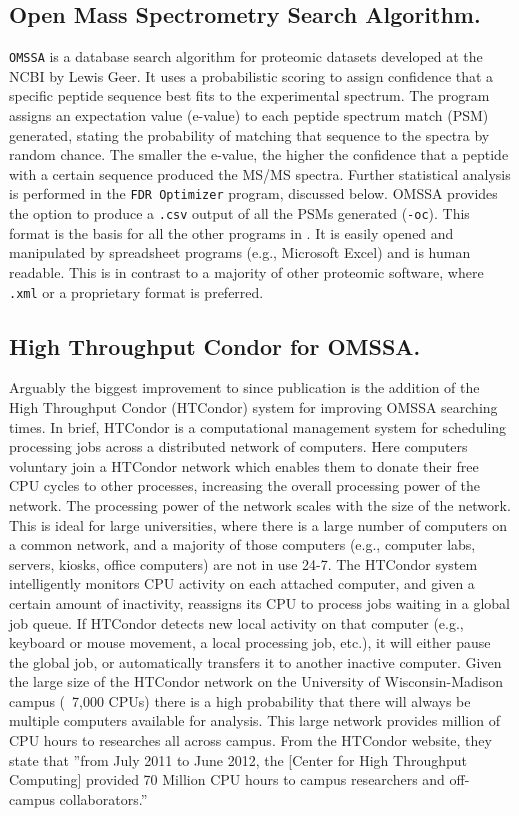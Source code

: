 \subsection*{Open Mass Spectrometry Search Algorithm.}
\texttt{OMSSA} is a database search algorithm for proteomic datasets developed at the NCBI by Lewis Geer.\cite{omssa} It uses a probabilistic scoring to assign confidence that a specific peptide sequence best fits to the experimental spectrum. The program assigns an expectation value (e-value) to each peptide spectrum match (PSM) generated, stating the probability of matching that sequence to the spectra by random chance. The smaller the e-value, the higher the confidence that a peptide with a certain sequence produced the MS/MS spectra. Further statistical analysis is performed in the \texttt{FDR Optimizer} program, discussed below. OMSSA provides the option to produce a \texttt{.csv} output of all the PSMs generated (\texttt{-oc}). This format is the basis for all the other programs in \compass{}. It is easily opened and manipulated by spreadsheet programs (e.g., Microsoft Excel) and is human readable. This is in contrast to a majority of other proteomic software, where \texttt{.xml} or a proprietary format is preferred.

\subsection*{High Throughput Condor for OMSSA.}
Arguably the biggest improvement to \compass{} since publication is the addition of the High Throughput Condor (HTCondor) system for improving OMSSA searching times. In brief, HTCondor is a computational management system for scheduling processing jobs across a distributed network of computers. Here computers voluntary join a HTCondor network which enables them to donate their free CPU cycles to other processes, increasing the overall processing power of the network. The processing power of the network scales with the size of the network. This is ideal for large universities, where there is a large number of computers on a common network, and a majority of those computers (e.g., computer labs, servers, kiosks, office computers) are not in use 24-7. The HTCondor system intelligently monitors CPU activity on each attached computer, and given a certain amount of inactivity, reassigns its CPU to process jobs waiting in a global job queue. If HTCondor detects new local activity on that computer (e.g., keyboard or mouse movement, a local processing job, etc.), it will either pause the global job, or automatically transfers it to another inactive computer. Given the large size of the HTCondor network on the University of Wisconsin-Madison campus (~7,000 CPUs) there is a high probability that there will always be multiple computers available for analysis. This large network provides million of CPU hours to researches all across campus. From the HTCondor website, they state that ''from July 2011 to June 2012, the [Center for High Throughput Computing] provided 70 Million CPU hours to campus researchers and off-campus collaborators.''

